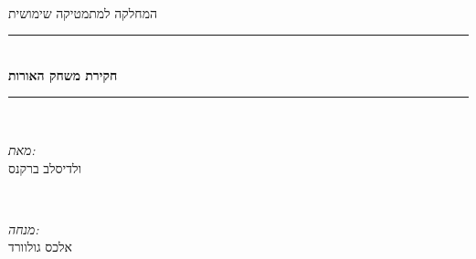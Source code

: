 \documentclass[12pt,twoside]{article}
\begin{document}
\begin{titlepage}
\newcommand{\HRule}{\rule{\linewidth}{0.5mm}} %

\center %


\textsc{\LARGE   
} \\[1.5cm]
\textsc{\LARGE 
המחלקה למתמטיקה שימושית
} \\[0.5cm]


\HRule \\[0.4cm]
{ \huge \bfseries
חקירת משחק האורות
 } \\[0.4cm] 
\HRule \\[1.5cm]


\begin{minipage}{0.4\textwidth}
\begin{flushleft} \large
\emph{מאת:} \\
ולדיסלב ברקנס
\end{flushleft}
\end{minipage}
~
\begin{minipage}{0.4\textwidth}
\begin{flushright} \large
\emph{מנחה:} \\
אלכס גולוורד 
\end{flushright}
\end{minipage} \\[2cm]


\end{titlepage}
\end{document}
